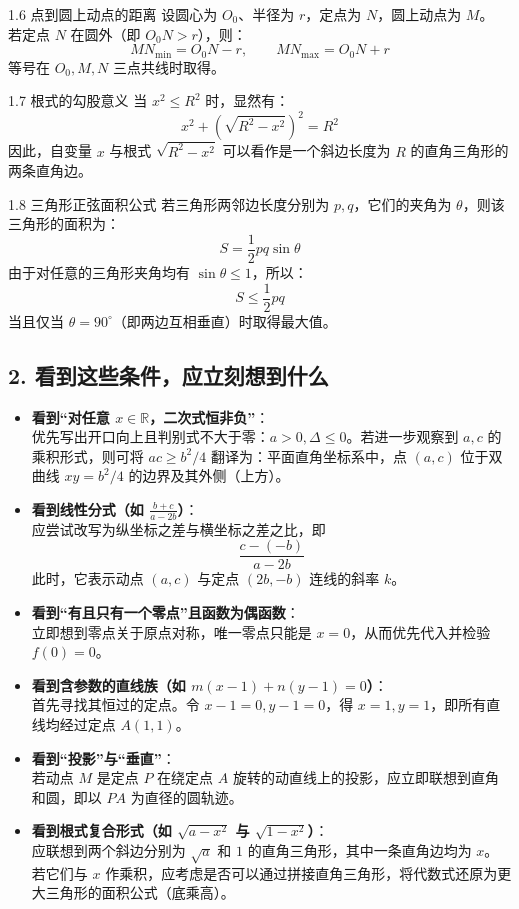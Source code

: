 \documentclass[11pt,a4paper]{ctexart}
\begin{document}
\begin{keybox}{1.6 点到圆上动点的距离}
设圆心为 $O_0$、半径为 $r$，定点为 $N$，圆上动点为 $M$。\\
若定点 $N$ 在圆外（即 $O_0N > r$），则：
$$MN_{\min} = O_0N - r,\qquad MN_{\max} = O_0N + r$$
等号在 $O_0, M, N$ 三点共线时取得。
\end{keybox}

\begin{keybox}{1.7 根式的勾股意义}
当 $x^2 \le R^2$ 时，显然有：
$$x^2 + \left(\sqrt{R^2 - x^2}\right)^2 = R^2$$
因此，自变量 $x$ 与根式 $\sqrt{R^2 - x^2}$ 可以看作是一个斜边长度为 $R$ 的直角三角形的两条直角边。
\end{keybox}

\begin{keybox}{1.8 三角形正弦面积公式}
若三角形两邻边长度分别为 $p, q$，它们的夹角为 $\theta$，则该三角形的面积为：
$$S = \frac{1}{2}pq\sin\theta$$
由于对任意的三角形夹角均有 $\sin\theta \le 1$，所以：
$$S \le \frac{1}{2}pq$$
当且仅当 $\theta = 90^\circ$（即两边互相垂直）时取得最大值。
\end{keybox}

\subsection{2. 看到这些条件，应立刻想到什么}

\begin{itemize}
  \item \textbf{看到“对任意 $x \in \mathbb{R}$，二次式恒非负”}：\\
        优先写出开口向上且判别式不大于零：$a > 0, \Delta \le 0$。若进一步观察到 $a, c$ 的乘积形式，则可将 $ac \ge b^2/4$ 翻译为：平面直角坐标系中，点 $(a,c)$ 位于双曲线 $xy = b^2/4$ 的边界及其外侧（上方）。
  \item \textbf{看到线性分式（如 $\frac{b+c}{a-2b}$）}：\\
        应尝试改写为纵坐标之差与横坐标之差之比，即
        $$\frac{c - (-b)}{a - 2b}$$
        此时，它表示动点 $(a,c)$ 与定点 $(2b,-b)$ 连线的斜率 $k$。
  \item \textbf{看到“有且只有一个零点”且函数为偶函数}：\\
        立即想到零点关于原点对称，唯一零点只能是 $x = 0$，从而优先代入并检验 $f(0) = 0$。
  \item \textbf{看到含参数的直线族（如 $m(x-1) + n(y-1) = 0$）}：\\
        首先寻找其恒过的定点。令 $x-1=0, y-1=0$，得 $x=1, y=1$，即所有直线均经过定点 $A(1,1)$。
  \item \textbf{看到“投影”与“垂直”}：\\
        若动点 $M$ 是定点 $P$ 在绕定点 $A$ 旋转的动直线上的投影，应立即联想到直角和圆，即以 $PA$ 为直径的圆轨迹。
  \item \textbf{看到根式复合形式（如 $\sqrt{a-x^2}$ 与 $\sqrt{1-x^2}$）}：\\
        应联想到两个斜边分别为 $\sqrt{a}$ 和 $1$ 的直角三角形，其中一条直角边均为 $x$。若它们与 $x$ 作乘积，应考虑是否可以通过拼接直角三角形，将代数式还原为更大三角形的面积公式（底乘高）。
\end{itemize}
\end{document}
